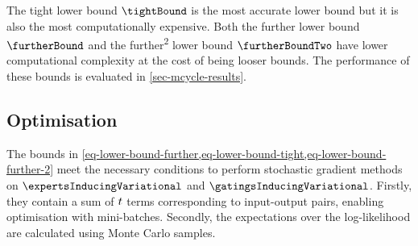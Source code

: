 \documentclass{mimosis-class/mimosis}
\numberwithin{equation}{chapter}
\newcommand{\numData}{\ensuremath{t}}
\newcommand{\modeInd}{\ensuremath{k}}
\newcommand{\NumData}{\ensuremath{\MakeUppercase{\numData}}}
\newcommand{\mode}[1]{\ensuremath{#1_{\modeInd}}}
\newcommand{\x}{\ensuremath{\mathbf{x}}}
\newcommand{\y}{\ensuremath{y}}
\newcommand{\gatingFunc}{\ensuremath{h}}
\newcommand{\GatingFunc}{\ensuremath{\mathbf{\gatingFunc}}}
\newcommand{\latentFunc}{\ensuremath{f}}
\begin{document}
{The tight lower bound \(\tightBound\) is the most accurate lower bound but it is also the most
computationally expensive.
Both the further lower bound \(\furtherBound\) and the further\textsuperscript{2} lower bound \(\furtherBoundTwo\)
have lower computational complexity at the cost of being looser bounds.
The performance of these bounds is evaluated in \cref{sec-mcycle-results}.

\subsection{Optimisation}
\label{sec:orgb0a052d}
\renewcommand{\expertSampleInd}{\ensuremath{s}}
\renewcommand{\ExpertSampleInd}{\ensuremath{S}}
\renewcommand{\gatingSampleInd}{\ensuremath{\hat{s}}}
\renewcommand{\GatingSampleInd}{\ensuremath{\hat{S}}}
\renewcommand{\batchSampleInd}{\ensuremath{i}}

\newcommand{\singleExpertLikelihoodSample}{\ensuremath{p\left(\y_{\batchSampleInd} \mid \expertInducingOutput^{(\expertSampleInd)}\right)}}
\renewcommand{\singleGatingLikelihoodSample}{\ensuremath{\Pr\left(\alpha_\batchSampleInd = \modeInd \mid \GatingFunc(\x_{\batchSampleInd})^{(\gatingSampleInd)} \right)}}

\newcommand{\singleGatingLikelihoodSample}{\ensuremath{\Pr\left(\alpha_\batchSampleInd = \modeInd \mid \GatingFunc_{\batchSampleInd}^{(\gatingSampleInd)} \right)}}

\newcommand{\gatingsVariationalSample}{\ensuremath{q(\GatingFunc(\x_{\batchSampleInd}))}}

The bounds in  \cref{eq-lower-bound-further,eq-lower-bound-tight,eq-lower-bound-further-2}
meet the necessary conditions to perform stochastic
gradient methods on \(\expertsInducingVariational\) and \(\gatingsInducingVariational\).
Firstly, they contain a sum of \(\NumData\) terms corresponding to input-output pairs, enabling optimisation
with mini-batches.
Secondly, the expectations over the log-likelihood are calculated using Monte Carlo samples.

}
\end{document}

